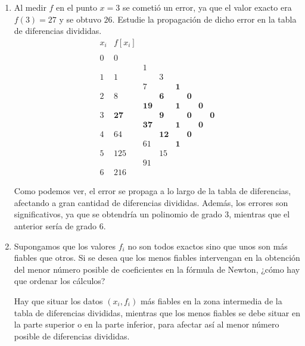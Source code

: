 \begin{ejercicio}
\begin{enumerate}
        \item Al medir $f$ en el punto $x = 3$ se cometió un error, ya que el valor exacto era $f(3) = 27$ y se obtuvo $26$. Estudie la propagación de dicho error en la tabla de diferencias divididas.
        \begin{equation*}
            \begin{array}{c|ccccccc}
                x_i & f[x_i] \\
                \\
                0 & 0 \\
                && 1\\
                1 & 1 && 3\\
                && 7&&\textbf{1}\\
                2 & 8 && \textbf{6} && \textbf{0}\\
                && \textbf{19} && \textbf{1} && \textbf{0}\\
                3 & \textbf{27} && \textbf{9} && \textbf{0} && \textbf{0}\\
                && \textbf{37} && \textbf{1} && \textbf{0}\\
                4 & 64 && \textbf{12} && \textbf{0}\\
                && 61  && \textbf{1}\\
                5 & 125 && 15\\
                && 91\\
                6 & 216
            \end{array}
        \end{equation*}

        Como podemos ver, el error se propaga a lo largo de la tabla de diferencias, afectando a gran cantidad de diferencias divididas. Además, los errores son significativos, ya que se obtendría un polinomio de grado 3, mientras que el anterior sería de grado 6.

        \item Supongamos que los valores $f_i$ no son todos exactos sino que unos son más fiables que otros. Si se desea que los menos fiables intervengan en la obtención del menor número posible de coeficientes en la fórmula de Newton, ¿cómo hay que ordenar los cálculos?

        Hay que situar los datos $(x_i,f_i)$ más fiables en la zona intermedia de la tabla de diferencias divididas, mientras que los menos fiables se debe situar en la parte superior o en la parte inferior, para afectar así al menor número posible de diferencias divididas.
        
    \end{enumerate}
\end{ejercicio}

